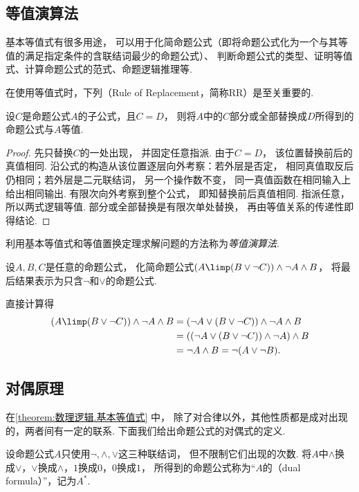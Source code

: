 \subsection{等值演算法}
基本等值式有很多用途，
可以用于化简命题公式（即将命题公式化为一个与其等值的满足指定条件的含联结词最少的命题公式）、
判断命题公式的类型、证明等值式、计算命题公式的范式、命题逻辑推理等.

在使用等值式时，下列（Rule of Replacement，简称RR）是至关重要的.
\begin{theorem}
设\(C\)是命题公式\(A\)的子公式，且\(C = D\)，
则将\(A\)中的\(C\)部分或全部替换成\(D\)所得到的命题公式与\(A\)等值.
    \begin{proof}
        先只替换\(C\)的一处出现，
        并固定任意指派.
        由于\(C=D\)，
        该位置替换前后的真值相同.
        沿公式的构造从该位置逐层向外考察：若外层是否定，
        相同真值取反后仍相同；若外层是二元联结词，
        另一个操作数不变，
        同一真值函数在相同输入上给出相同输出.
        有限次向外考察到整个公式，
        即知替换前后真值相同.
        指派任意，
        所以两式逻辑等值.
        部分或全部替换是有限次单处替换，
        再由等值关系的传递性即得结论.
    \end{proof}
\end{theorem}

利用基本等值式和等值置换定理求解问题的方法称为\emph{等值演算法}.

\begin{example}
设\(A,B,C\)是任意的命题公式，
化简命题公式\((A \limp (B \lor \neg C)) \land \neg A \land B\)，
将最后结果表示为只含\(\neg\)和\(\lor\)的命题公式.
\begin{solution}
直接计算得\begin{align*}
	(A \limp (B \lor \neg C)) \land \neg A \land B
	&= (\neg A \lor (B \lor \neg C)) \land \neg A \land B \\
	&= ((\neg A \lor (B \lor \neg C)) \land \neg A) \land B \\
	&= \neg A \land B
	= \neg(A \lor \neg B).
\end{align*}
\end{solution}
\end{example}

\subsection{对偶原理}
在\cref{theorem:数理逻辑.基本等值式} 中，
除了对合律以外，其他性质都是成对出现的，两者间有一定的联系.
下面我们给出命题公式的对偶式的定义.
\begin{definition}
    设命题公式\(A\)只使用\(\neg,\land,\lor\)这三种联结词，
    但不限制它们出现的次数.
将\(A\)中\(\land\)换成\(\lor\)，\(\lor\)换成\(\land\)，\(1\)换成\(0\)，\(0\)换成\(1\)，
所得到的命题公式称为“\(A\)的（dual formula）”，记为\(A^*\).
\end{definition}

